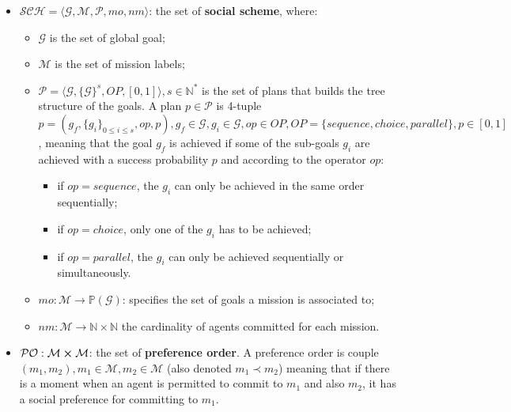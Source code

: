 \documentclass[pdflatex,sn-mathphys-num]{sn-jnl}%
\theoremstyle{thmstyleone}%
\theoremstyle{thmstyletwo}%
\theoremstyle{thmstylethree}%
\begin{document}
\begin{itemize}
    \item $\mathcal{SCH} = \langle\mathcal{G}, \mathcal{M}, \mathcal{P}, mo, nm \rangle$: the set of \textbf{social scheme}, where:
          \begin{itemize}
              \item $\mathcal{G}$ is the set of global goal;

              \item $\mathcal{M}$ is the set of mission labels;
              \item $\mathcal{P} = \langle \mathcal{G}, \{\mathcal{G}\}^s, OP, [0,1] \rangle, s \in \mathbb{N}^*$ is the set of plans that builds the tree structure of the goals.
              A plan $p \in \mathcal{P}$ is 4-tuple $p=(g_f,\{g_i\}_{0 \leq i \leq s}, op, p), g_f \in \mathcal{G}, g_i \in \mathcal{G}, op \in OP, OP = \{sequence, choice, parallel\}, p \in [0,1]$, meaning that the goal $g_f$ is achieved if some of the sub-goals $g_i$ are achieved with a success probability $p$ and according to the operator $op$:
              \begin{itemize}
                \item if $op = sequence$, the $g_i$ can only be achieved in the same order sequentially;
                \item if $op = choice$, only one of the $g_i$ has to be achieved;
                \item if $op = parallel$, the $g_i$ can only be achieved sequentially or simultaneously.
              \end{itemize}

              \item $mo: \mathcal{M} \rightarrow \mathbb{P}(\mathcal{G})$: specifies the set of goals a mission is associated to;
              \item $nm: \mathcal{M} \rightarrow \mathbb{N} \times \mathbb{N}$ the cardinality of agents committed for each mission.
          \end{itemize}
    \item $\mathcal{PO}: \mathcal{M} \cross \mathcal{M}$: the set of \textbf{preference order}. A preference order is couple $(m_1, m_2), m_1 \in \mathcal{M}, m_2 \in \mathcal{M}$ (also denoted $m_{1} \prec m_{2}$) meaning that if there is a moment when an agent is permitted to commit to $m_{1}$ and also $m_{2}$, it has a social preference for committing to $m_{1}$.
\end{itemize}
\end{document}
